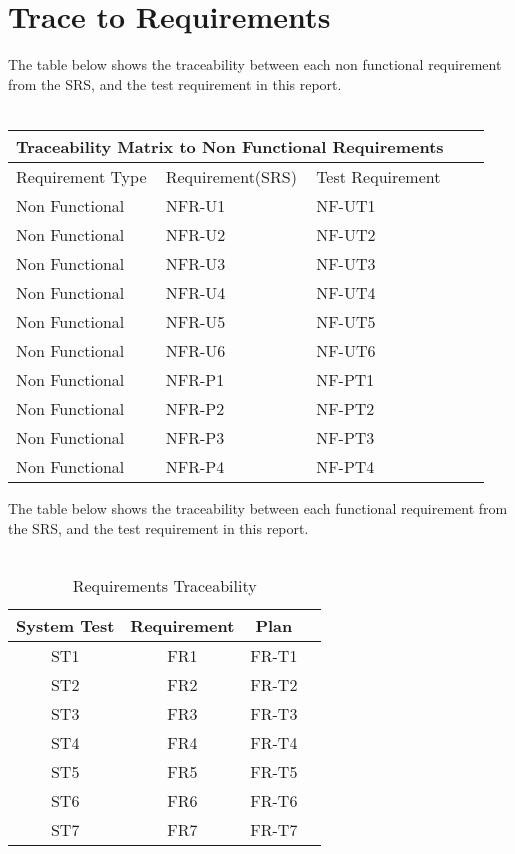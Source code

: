 \documentclass[12pt, titlepage]{article}
\begin{document}
\section{Trace to Requirements}
The table below shows the traceability between each non functional requirement from the SRS, and the test requirement in this report.\\
\\
\begin{tabular}{ |p{3cm}||p{4cm}|p{4cm}|p{4cm}|p{4cm}| }
  \hline
  \multicolumn{3}{|c|}{Traceability Matrix to Non Functional Requirements} \\
  \hline
  Requirement Type & Requirement(SRS) & Test Requirement \\
  \hline
  Non Functional   & NFR-U1  & NF-UT1  \\ \hline
  Non Functional   & NFR-U2  & NF-UT2  \\ \hline
  Non Functional   & NFR-U3  & NF-UT3  \\ \hline
  Non Functional   & NFR-U4  & NF-UT4  \\ \hline
  Non Functional   & NFR-U5  & NF-UT5   \\ \hline
  Non Functional   & NFR-U6  & NF-UT6  \\ \hline
  Non Functional   & NFR-P1  & NF-PT1  \\ \hline
  Non Functional   & NFR-P2  & NF-PT2  \\ \hline
  Non Functional   & NFR-P3  & NF-PT3  \\ \hline
  Non Functional   & NFR-P4  & NF-PT4  \\ \hline
  
 \end{tabular}

 The table below shows the traceability between each functional requirement from the SRS, and the test requirement in this report.\\
\\

\begin{table}[H]
	\centering
	\caption{Requirements Traceability}
	\label{my-label}
	\begin{tabular}{|c|c|c|c|}
		\hline
		\textbf{System Test} & \textbf{Requirement} & \textbf{Plan} \\ \hline
		ST1  & FR1 &FR-T1 \\ \hline
		ST2  & FR2 &FR-T2\\ \hline
		ST3  & FR3 &FR-T3\\ \hline
		ST4  & FR4 &FR-T4\\ \hline
		ST5  & FR5 &FR-T5\\ \hline
		ST6  & FR6 &FR-T6\\ \hline
		ST7  & FR7 &FR-T7\\ \hline
	\end{tabular}
\end{table}
		
\end{document}
